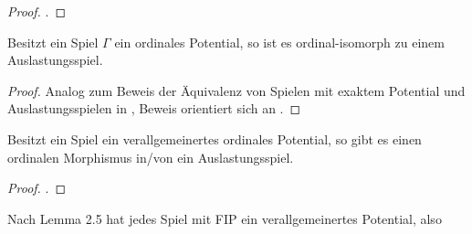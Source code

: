 \begin{proof}
	.
	
\end{proof}

\begin{satz}
	Besitzt ein Spiel $\Gamma$ ein ordinales Potential, so ist es ordinal-isomorph zu einem Auslastungsspiel.
\end{satz}

\begin{proof}
	Analog zum Beweis der Äquivalenz von Spielen mit exaktem Potential und Auslastungsspielen in \cite{MonShap}, Beweis orientiert sich an \cite{MultiPotGames}.
\end{proof}

\begin{beob}
	Besitzt ein Spiel ein verallgemeinertes ordinales Potential, so gibt es einen ordinalen Morphismus in/von  ein Auslastungsspiel.
\end{beob}

\begin{proof}
	.
\end{proof}

\begin{beob}
	Nach \cite{MonShap} Lemma 2.5 hat jedes Spiel mit FIP ein verallgemeinertes Potential, also 
\end{beob}